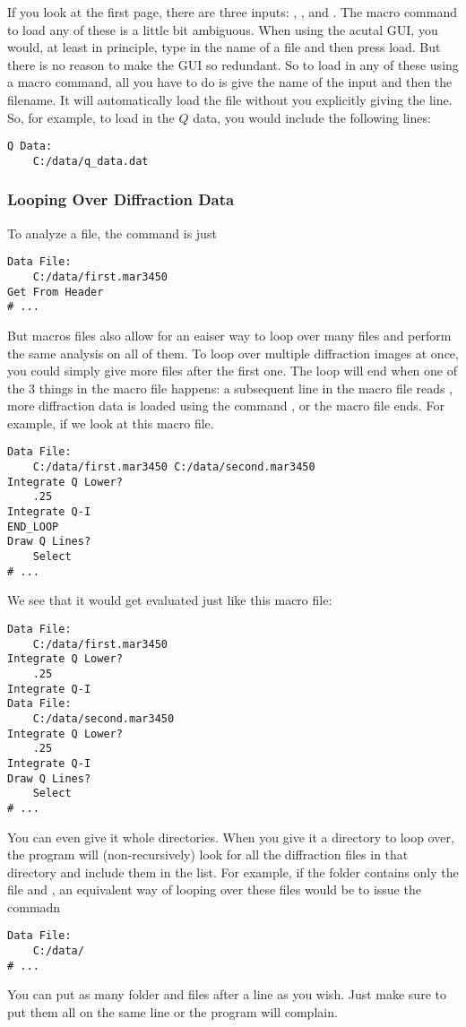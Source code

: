 If you look at the first page, there are three inputs:
, , and 
. The macro command to load any of these
is a little bit ambiguous. When using the acutal GUI, 
you would, at least in principle, type in the name of
a file and then press load. But there is no reason to
make the GUI so redundant. So to load in any of these
using a macro command, all you have to do is give the 
name of the input and then the filename. It will 
automatically load the file without you explicitly
giving the  line. So, for example,
to load in the $Q$ data, you would include the 
following lines:
\begin{lstlisting}[caption={'Load the $Q$ Data'}]
Q Data:
    C:/data/q_data.dat
\end{lstlisting}

\subsubsection{Looping Over Diffraction Data}

To analyze a file, the command is just 
\begin{lstlisting}[caption={'Load the Diffraction Data'}]
Data File:
    C:/data/first.mar3450
Get From Header
# ...
\end{lstlisting}
But macros files also allow for an eaiser way
to loop over many files and perform the same
analysis on all of them.  
To loop over multiple diffraction images at once,
you could simply give more files after the first 
one. The loop will end when 
one of the 3 things in the macro 
file happens: a subsequent line in the macro
file reads , more diffraction data
is loaded using the command , or
the macro file ends. For example, if we look at this 
macro file.
\begin{lstlisting}[caption={'Loop Over Diffraction Data'}]
Data File:
    C:/data/first.mar3450 C:/data/second.mar3450 
Integrate Q Lower?
    .25
Integrate Q-I
END_LOOP
Draw Q Lines?
    Select
# ...
\end{lstlisting}
We see that it would get evaluated just like this
macro file:
\begin{lstlisting}[caption={'An Equivalent Macro'}]
Data File:
    C:/data/first.mar3450 
Integrate Q Lower?
    .25
Integrate Q-I
Data File:
    C:/data/second.mar3450 
Integrate Q Lower?
    .25
Integrate Q-I
Draw Q Lines?
    Select
# ...
\end{lstlisting}
You can even give it whole directories. When
you give it a directory to loop over, the program 
will (non-recursively) look for all the diffraction 
files in that directory and include them in the list. 
For example, if the folder  contains
only the file  and
, an equivalent way of looping
over these files would be to issue the commadn
\begin{lstlisting}[caption={'Load the Diffraction Data'}]
Data File:
    C:/data/
# ...
\end{lstlisting}
You can put as many folder and files after a 
 line as you wish.
Just make sure to put them all on the same line 
or the program will complain.

